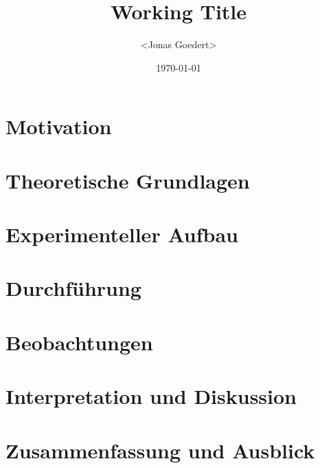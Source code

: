 \documentclass[12pt,a4paper]{scrartcl}
\title{Working Title }
\author{<Jonas Goedert>}
\date{\today}
\begin{document}
\maketitle

\begin{abstract}

\end{abstract}
\clearpage

\tableofcontents
\newpage

\section{Motivation}

\clearpage

\section{Theoretische Grundlagen}

\clearpage

\section{Experimenteller Aufbau}

\clearpage

\section{Durchführung}

\clearpage

\section{Beobachtungen}

\clearpage

\section{Interpretation und Diskussion}

\clearpage

\section{Zusammenfassung und Ausblick}

\clearpage

\printglossaries %

\end{document}
